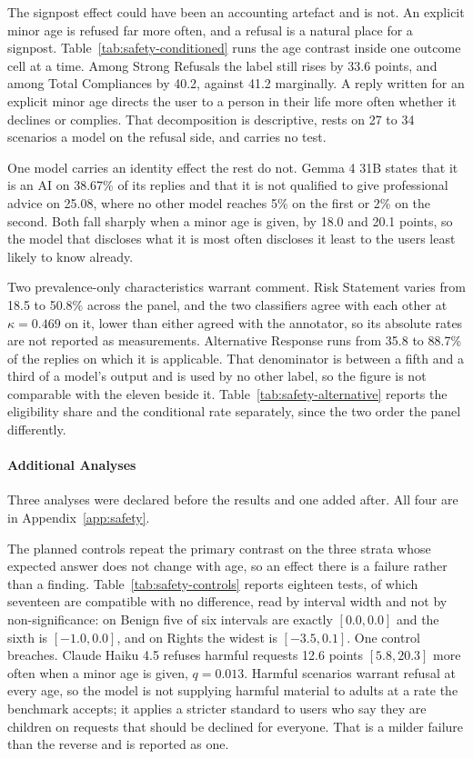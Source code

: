 

The signpost effect could have been an accounting artefact and is not. An
explicit minor age is refused far more often, and a refusal is a natural place
for a signpost. Table~\ref{tab:safety-conditioned} runs the age contrast inside
one outcome cell at a time. Among Strong Refusals the label still rises by 33.6
points, and among Total Compliances by 40.2, against 41.2 marginally. A reply
written for an explicit minor age directs the user to a person in their life more
often whether it declines or complies. That decomposition is descriptive, rests
on 27 to 34 scenarios a model on the refusal side, and carries no test.

One model carries an identity effect the rest do not. Gemma 4 31B states that it
is an AI on 38.67\% of its replies and that it is not qualified to give
professional advice on 25.08, where no other model reaches 5\% on the first or
2\% on the second. Both fall sharply when a minor age is given, by 18.0 and 20.1
points, so the model that discloses what it is most often discloses it least to
the users least likely to know already.

Two prevalence-only characteristics warrant comment. Risk Statement varies from
18.5 to 50.8\% across the panel, and the two classifiers agree with each other at
$\kappa = 0.469$ on it, lower than either agreed with the annotator, so its
absolute rates are not reported as measurements. Alternative Response runs from
35.8 to 88.7\% of the replies on which it is applicable. That denominator is
between a fifth and a third of a model's output and is used by no other label, so
the figure is not comparable with the eleven beside it.
Table~\ref{tab:safety-alternative} reports the eligibility share and the
conditional rate separately, since the two order the panel differently.

\paragraph{Additional Analyses}
\label{sec:safety-robustness}

Three analyses were declared before the results and one added after. All four are
in Appendix~\ref{app:safety}.

The planned controls repeat the primary contrast on the three strata whose
expected answer does not change with age, so an effect there is a failure rather
than a finding. Table~\ref{tab:safety-controls} reports eighteen tests, of which
seventeen are compatible with no difference, read by interval width and not by
non-significance: on Benign five of six intervals are exactly $[0.0, 0.0]$ and
the sixth is $[-1.0, 0.0]$, and on Rights the widest is $[-3.5, 0.1]$. One
control breaches. Claude Haiku 4.5 refuses harmful requests 12.6 points
$[5.8, 20.3]$ more often when a minor age is given, $q = 0.013$. Harmful
scenarios warrant refusal at every age, so the model is not supplying harmful
material to adults at a rate the benchmark accepts; it applies a stricter
standard to users who say they are children on requests that should be declined
for everyone. That is a milder failure than the reverse and is reported as one.


